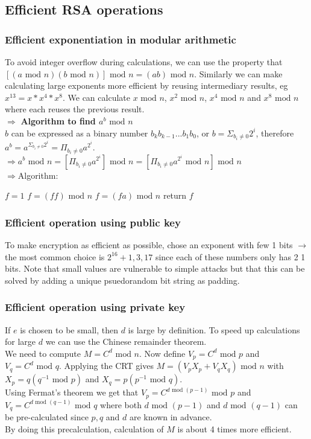 \documentclass[12pt]{article}
\begin{document}
 \subsection{Efficient RSA operations}
 \subsubsection{Efficient exponentiation in modular arithmetic}
 To avoid integer overflow during calculations, we can use the property that $[(a\text{ mod }n)(b\text{ mod }n)]\text{ mod }n = (ab)\text{ mod }n$. Similarly we can make calculating large exponents more efficient by reusing intermediary results, eg $x^{13} = x*x^4*x^8$. We can calculate $x\text{ mod }n$, $x^2\text{ mod }n$, $x^4\text{ mod }n$ and $x^8\text{ mod }n$ where each reuses the previous result.\\
 $\Rightarrow$ \textbf{Algorithm to find $a^b\text{ mod }n$}\\
 $b$ can be expressed as a binary number $b_kb_{k-1}...b_1b_0$, or $b = \Sigma_{b_i\ne 0}2^i$, therefore $a^b = a^{\Sigma_{b_i\ne 0}2^i} = \Pi_{b_i\ne 0}a^{2^i}$.\\
 $\Rightarrow a^b\text{ mod }n = [\Pi_{b_i\ne 0}a^{2^i}]\text{ mod }n = [\Pi_{b_i\ne 0}a^{2^i}\text{ mod }n]\text{ mod }n $\\
 $\Rightarrow$Algorithm:
 \begin{algorithmic}
 	\State $f = 1$
 	\State $f = (ff)\text{ mod }n$
 	\State $f = (fa)\text{ mod }n$
 	\EndIf
	\EndFor
	\State return $f$
 \end{algorithmic}
 	
 \subsubsection{Efficient operation using public key}
 To make encryption as efficient as possible, chose an exponent with few 1 bits $\rightarrow$ the most common choice is $2^{16}+1, 3, 17$ since each of these numbers only has 2 1 bits. Note that small values are vulnerable to simple attacks but that this can be solved by adding a unique psuedorandom bit string as padding.
 
 \subsubsection{Efficient operation using private key}
 If $e$ is chosen to be small, then $d$ is large by definition. To speed up calculations for large $d$ we can use the Chinese remainder theorem.\\
 We need to compute $M = C^d\text{ mod }n$. Now define $V_p = C^d\text{ mod }p$ and $V_q = C^d\text{ mod }q$. Applying the CRT gives $M = (V_pX_p + V_qX_q)\text{ mod }n$ with $X_p = q(q^{-1}\text{ mod }p)$ and $X_q = p(p^{-1}\text{ mod }q)$.\\
 Using Fermat's theorem we get that $V_p = C^{d\text{ mod }(p-1)}\text{ mod }p$ and $V_q = C^{d\text{ mod }(q-1)}\text{ mod }q$ where both $d\text{ mod }(p-1)$ and $d\text{ mod }(q-1)$ can be pre-calculated since $p, q$ and $d$ are known in advance.\\
 By doing this precalculation, calculation of $M$ is about 4 times more efficient.
 
\end{document}
